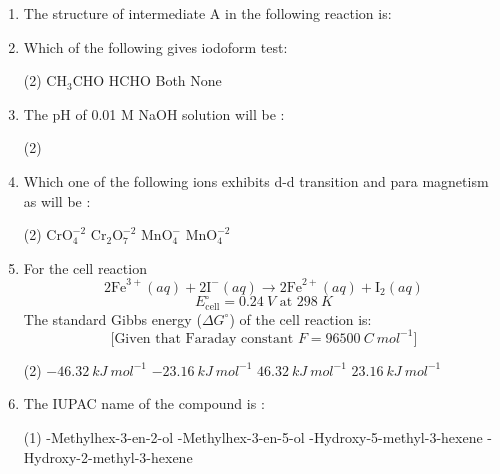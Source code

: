 \documentclass[twocolumn]{article}
\begin{document}
\begin{enumerate}
    \item The structure of intermediate A in the following reaction is:
    \begin{center}
    \end{center}
    \item Which of the following gives iodoform test:
    \begin{tasks}(2)
        \task CH$_3$CHO
        \task HCHO
        \task Both
        \task None
    \end{tasks}

    \item The pH of 0.01 M NaOH solution will be : 
    \begin{tasks}(2)
    \end{tasks}
    
    \item Which one of the following ions exhibits d-d transition and para magnetism as will be :
    \begin{tasks}(2)
        \task $\text{CrO}_4^{-2}$
        \task $\text{Cr}_2\text{O}_7^{-2}$
        \task $\text{MnO}_4^{-}$
        \task $\text{MnO}_4^{-2}$
    \end{tasks}
    
    \item For the cell reaction
    \[2\text{Fe}^{3+} (aq) + 2\text{I}^- (aq) \rightarrow 2\text{Fe}^{2+} (aq) + \text{I}_2(aq)\]
    \[E^\circ_{\text{cell}} = 0.24\ V \text{ at } 298\ K\]
    The standard Gibbs energy ($\Delta G^\circ$) of the cell reaction is:
    \[\text{[Given that Faraday constant } F = 96500\ C\ mol^{-1}]\]
    \begin{tasks}(2)
        \task $-46.32\ kJ\ mol^{-1}$
        \task $-23.16\ kJ\ mol^{-1}$
        \task $46.32\ kJ\ mol^{-1}$
        \task $23.16\ kJ\ mol^{-1}$
    \end{tasks}
    
    \item The IUPAC name of the compound is :
    \begin{center}
    \end{center}
    \begin{tasks}(1)
        -Methylhex-3-en-2-ol
        -Methylhex-3-en-5-ol
        -Hydroxy-5-methyl-3-hexene
        -Hydroxy-2-methyl-3-hexene
    \end{tasks}
    

\end{enumerate}
\end{document}
